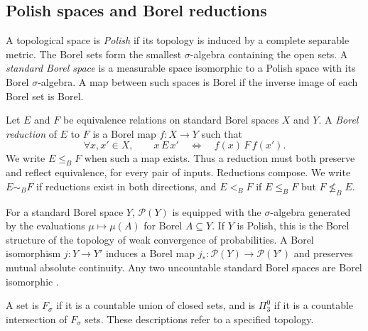 \documentclass[11pt]{article}
\theoremstyle{definition}
\newcommand{\Prob}{\mathcal P}
\newcommand{\leB}{\mathrel{\leq_B}}
\newcommand{\nleB}{\mathrel{\nleq_B}}
\begin{document}
\subsection{Polish spaces and Borel reductions}
A topological space is \emph{Polish} if its topology is induced by a
complete separable metric. The Borel sets form the smallest
$\sigma$-algebra containing the open sets. A \emph{standard Borel space}
is a measurable space isomorphic to a Polish space with its Borel
$\sigma$-algebra. A map between such spaces is Borel if the inverse image
of each Borel set is Borel.

Let $E$ and $F$ be equivalence relations on standard Borel spaces $X$ and
$Y$. A \emph{Borel reduction} of $E$ to $F$ is a Borel map $f:X\to Y$
such that
\[
 \forall x,x'\in X,\qquad
 x\,E\,x' \quad\Longleftrightarrow\quad f(x)\,F\,f(x').
\]
We write $E\leB F$ when such a map exists. Thus a reduction must both
preserve and reflect equivalence, for every pair of inputs. Reductions
compose. We write $E\sim_B F$ if reductions exist in both directions, and
$E<_B F$ if $E\leB F$ but $F\nleB E$.

For a standard Borel space $Y$, $\Prob(Y)$ is equipped with the
$\sigma$-algebra generated by the evaluations
$\mu\mapsto\mu(A)$ for Borel $A\subseteq Y$. If $Y$ is Polish, this is
the Borel structure of the topology of weak convergence of probabilities.
A Borel isomorphism $j:Y\to Y'$ induces a Borel map
$j_*:\Prob(Y)\to\Prob(Y')$ and preserves mutual absolute continuity.
Any two uncountable standard Borel spaces are Borel isomorphic
\cite[Corollary 1.4.3]{Gao}.

A set is $F_\sigma$ if it is a countable union of closed sets, and is
$\Pi^0_3$ if it is a countable intersection of $F_\sigma$ sets. These
descriptions refer to a specified topology.
\end{document}
